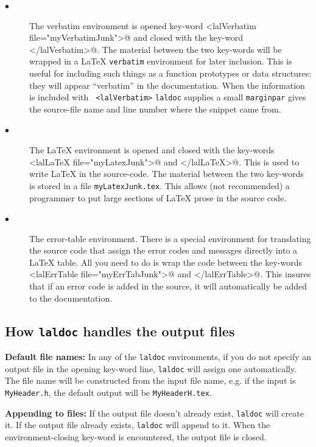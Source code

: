 \documentclass[oneside]{book}
\begin{document}
\begin{description}
\item[$\bullet$ ]
The verbatim environment is opened key-word 
{\verb@<lalVerbatim file="myVerbatimJunk">@}  and closed with the key-word
{\verb@</lalVerbatim>@}. The material between the two key-words will
be wrapped in a {\LaTeX} {\tt verbatim} environment for later
inclusion.  This is useful for including such things as a function
prototypes or data structures: they will appear ``verbatim'' in the
documentation.  When the information is included with {\tt
<lalVerbatim>} {\tt laldoc} supplies a small {\tt marginpar} gives the
source-file name and line number where the snippet came from.
\vspace*{-0.05in}
\item[$\bullet$ ] 
The {\LaTeX} environment is opened and closed with the key-words
{\verb@<lalLaTeX file="myLatexJunk">@}  and {\verb@</lalLaTeX>@}. This is
used to write {\LaTeX} in the source-code. The material between the two
key-words is stored in a file {\tt myLatexJunk.tex}.  This allows (not
recommended) a programmer to put large sections of {\LaTeX} prose in the
source code.  
\vspace*{-0.05in}
\item[$\bullet$ ] 
The error-table environment.  There is a special environment for
translating the source code that assign the error codes and messages
directly into a {\LaTeX} table. All you need to do is wrap the code
between the key-words {\verb@<lalErrTable file="myErrTabJunk">@} and
{\verb@</lalErrTable>@}.  This insures that if an error code is added
in the source, it will automatically be added to the documentation.
\vspace*{-0.051in}
\end{description}

\subsection{ How {\texttt {laldoc}} handles the output files}

{\bf Default file names:} In any of the {\texttt {laldoc}} environments,
if you do not specify an output file in the opening key-word line,
{\texttt {laldoc}} will assign one automatically. The file name will
be constructed from the input file name, e.g. if the input
is  {\tt MyHeader.h}, the default output will be {\tt MyHeaderH.tex}.

{\bf Appending to files:}
If the output file doesn't already exist, {\texttt {laldoc}} will
create it.  If the output file already exists, {\texttt {laldoc}} will
append to it.  When the environment-closing key-word is encountered,
the output file is closed.
\end{document}
